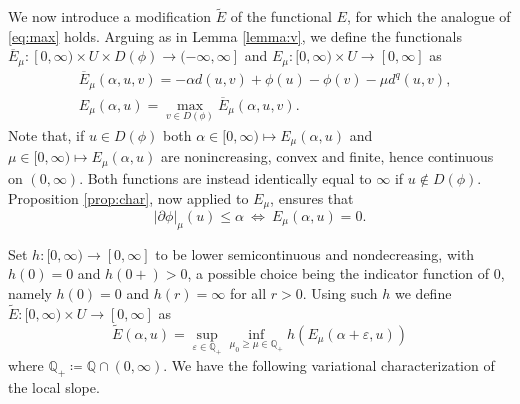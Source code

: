 \documentclass[reqno]{amsart}
\newcommand{\Qz}{\mathbb{Q}}
\newcommand{\epsi}{\varepsilon}
\newcommand{\ove}{\overline}
\renewcommand{\sl}{|\partial \phi|}
\begin{document}
 We now  introduce a modification
$\tilde E$ of the functional $E$, for which the  analogue  of \eqref{eq:max} holds. 
Arguing as in Lemma \ref{lemma:v}, we define the functionals $\ove E_{ \mu}: [0,\infty) \times U \times
D(\phi) \to (-\infty,\infty]$ and $E_\mu: [0,\infty) \times U \to
[0,\infty]$ as
\begin{align*}
  &\ove E_\mu(\alpha,u,v) = -\alpha d(u,v) + \phi(u)
  -\phi(v)- {\mu} d^q(u,v),\\
  &E_\mu(\alpha,u) = \max_{v\in D(\phi)} \ove E_\mu(\alpha,u,v).
\end{align*}
Note  that, if $u \in D(\phi)$  both $\alpha\in [0,\infty)  \mapsto E_\mu(\alpha,u)$ and
$\mu \in [0,\infty)  \mapsto  E_\mu(\alpha,u)$ are
nonincreasing, convex  and finite,  hence
continuous on  $(0,\infty)$.  Both functions are instead identically equal to $\infty$ if $u \notin D(\phi)$. 
Proposition \ref{prop:char}, now applied to $E_\mu$, ensures that
\begin{equation}\sl_\mu(u) \leq \alpha \ \Leftrightarrow \
E_\mu(\alpha,u)=0.\label{eq:emu}
\end{equation}

Set $h:[0,\infty) \to [0,\infty]$ to be lower semicontinuous and
nondecreasing, with $h(0)=0$ and $h(0+)>0$, a possible choice being the 
indicator
function of $0$, namely $h(0)=0$ and $h(r)=\infty$ for all
$r>0$. Using such $h$ we define
$\tilde E :[0,\infty) \times U \to
[0,\infty]$ as
\begin{equation}\label{eq:nuovo}\tilde E(\alpha,u) = \sup_{\epsi \in \Qz_+}
  \inf_{ \mu_0\geq \mu \in \Qz_+} h(E_\mu(\alpha+\epsi,u))
\end{equation}
where $\Qz_+ \coloneqq \Qz \cap (0,\infty)$.
We have the following variational characterization of the local slope.
\end{document}
